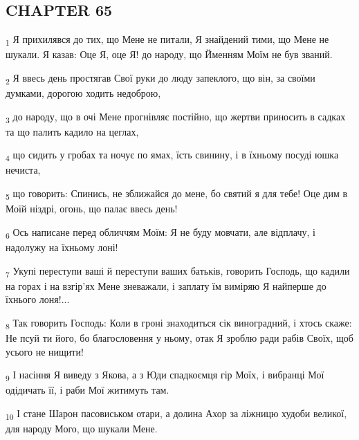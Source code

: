 \subsection{CHAPTER 65}
\begin{tcolorbox}
\textsubscript{1} Я прихилявся до тих, що Мене не питали, Я знайдений тими, що Мене не шукали. Я казав: Оце Я, оце Я! до народу, що Йменням Моїм не був званий.
\end{tcolorbox}
\begin{tcolorbox}
\textsubscript{2} Я ввесь день простягав Свої руки до люду запеклого, що він, за своїми думками, дорогою ходить недоброю,
\end{tcolorbox}
\begin{tcolorbox}
\textsubscript{3} до народу, що в очі Мене прогнівляє постійно, що жертви приносить в садках та що палить кадило на цеглах,
\end{tcolorbox}
\begin{tcolorbox}
\textsubscript{4} що сидить у гробах та ночує по ямах, їсть свинину, і в їхньому посуді юшка нечиста,
\end{tcolorbox}
\begin{tcolorbox}
\textsubscript{5} що говорить: Спинись, не зближайся до мене, бо святий я для тебе! Оце дим в Моїй ніздрі, огонь, що палає ввесь день!
\end{tcolorbox}
\begin{tcolorbox}
\textsubscript{6} Ось написане перед обличчям Моїм: Я не буду мовчати, але відплачу, і надолужу на їхньому лоні!
\end{tcolorbox}
\begin{tcolorbox}
\textsubscript{7} Укупі переступи ваші й переступи ваших батьків, говорить Господь, що кадили на горах і на взгір'ях Мене зневажали, і заплату їм виміряю Я найперше до їхнього лоня!...
\end{tcolorbox}
\begin{tcolorbox}
\textsubscript{8} Так говорить Господь: Коли в гроні знаходиться сік виноградний, і хтось скаже: Не псуй ти його, бо благословення у ньому, отак Я зроблю ради рабів Своїх, щоб усього не нищити!
\end{tcolorbox}
\begin{tcolorbox}
\textsubscript{9} І насіння Я виведу з Якова, а з Юди спадкоємця гір Моїх, і вибранці Мої одідичать її, і раби Мої житимуть там.
\end{tcolorbox}
\begin{tcolorbox}
\textsubscript{10} І стане Шарон пасовиськом отари, а долина Ахор за ліжницю худоби великої, для народу Мого, що шукали Мене.
\end{tcolorbox}
